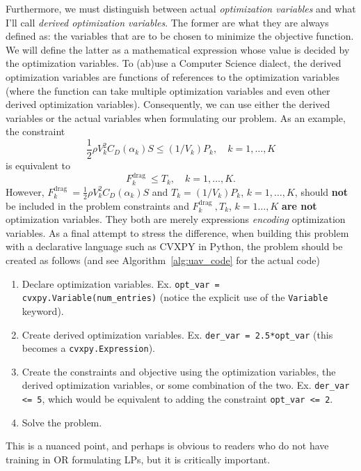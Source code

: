 \documentclass[12pt,reqno]{article}
\theoremstyle{definition}
\numberwithin{equation}{section}
\begin{document}
    Furthermore,
    we must distinguish between actual \textit{optimization variables} and what I'll call \textit{derived optimization variables}.
    The former are what they are always defined as: the variables that are to be chosen to minimize the objective function.
    We will define the latter as a mathematical expression whose value is decided by the optimization variables.
    To (ab)use a Computer Science dialect, the derived optimization variables are functions of references to the optimization variables
    (where the function can take multiple optimization variables and even other derived optimization variables).
    Consequently, we can use either the derived variables or the actual variables when formulating our problem.
    As an example, the constraint
    \[\frac{1}{2} \rho V_k^2 C_D\left(\alpha_k\right) S \le \left(1/V_k \right)P_k, \quad k = 1, \ldots, K\]
    is equivalent to
    \[F_k^{\text {drag }} \le T_k, \quad k=1, \ldots, K.\]
    However, $F_k^{\text {drag }} = \frac{1}{2} \rho V_k^2 C_D\left(\alpha_k\right) S$ and $T_k = \left(1/V_k \right)P_k$, $k = 1, \ldots, K$,
    should \textbf{not} be included in the problem constraints and $F_k^{\text {drag }}, T_k$, $k=1\ldots, K$ 
    \textbf{are not} optimization variables. They both are merely expressions \textit{encoding} optimization variables.
    As a final attempt to stress the difference, when building this problem with a declarative language such as CVXPY in Python,
    the problem should be created as follows (and see Algorithm~\ref{alg:uav_code} for the actual code)
    \begin{enumerate}
        \item Declare optimization variables. Ex. \lstinline|opt_var = cvxpy.Variable(num_entries)| (notice the explicit
        use of the \lstinline|Variable| keyword).
        \item Create derived optimization variables. Ex. \lstinline|der_var = 2.5*opt_var| (this becomes a \lstinline|cvxpy.Expression|).
        \item Create the constraints and objective using the optimization variables,
        the derived optimization variables, or some combination of the two. Ex. \lstinline|der_var <= 5|,
        which would be equivalent to adding the constraint \lstinline|opt_var <= 2|.
        \item Solve the problem.
    \end{enumerate}
    This is a nuanced point, and perhaps is obvious
    to readers who do not have training in OR formulating LPs, but it is critically important.
\end{document}

